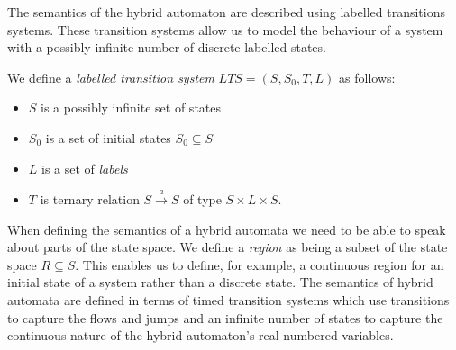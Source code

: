 The semantics of the hybrid automaton are described using labelled transitions systems. These transition systems allow us to model the behaviour of a system with a possibly infinite number of discrete labelled states. 
\medskip
\begin{mydef}
We define a \emph{labelled transition system} $LTS = (S,S_0,T,L)$ as follows:
\begin{itemize}

\item $S$ is a possibly infinite set of states

\item $S_0$ is a set of initial states $S_0 \subseteq S$

\item $L$ is a set of \emph{labels}

\item $T$ is ternary  relation $S \xrightarrow{a} S$ of type $S \times L \times S$.

\end{itemize}
\end{mydef}
\medskip
When defining the semantics of a hybrid automata we need to be able to speak about parts of the state space.  We define a \emph{region} as being a subset of the state space $R \subseteq S$.  This enables us to define, for example, a continuous region for an initial state of a system rather than a discrete state. The semantics of hybrid automata are defined in terms of  timed transition systems which use transitions to capture the flows and jumps and an infinite number of states to capture the continuous nature of the hybrid automaton's real-numbered variables.

